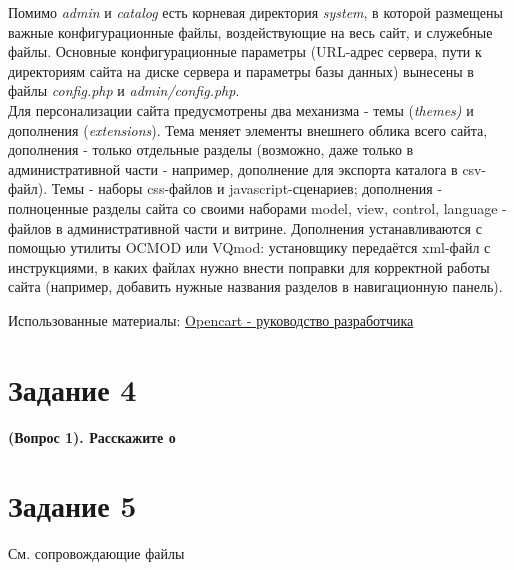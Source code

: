 \documentclass[a4paper,12pt]{article} %
\begin{document}
Помимо \textit{admin} и \textit{catalog} есть корневая директория \textit{system}, в которой размещены важные конфигурационные файлы, воздействующие на весь сайт, и служебные файлы. Основные конфигурационные параметры (URL-адрес сервера, пути к директориям сайта на диске сервера и параметры базы данных) вынесены в файлы \textit{config.php} и \textit{admin/config.php}.\\
Для персонализации сайта предусмотрены два механизма - темы (\textit{themes)} и дополнения (\textit{extensions}). Тема меняет элементы внешнего облика всего сайта, дополнения - только отдельные разделы (возможно, даже только в административной части - например, дополнение для экспорта каталога в csv-файл). Темы - наборы css-файлов и javascript-сценариев; дополнения - полноценные разделы сайта со своими наборами model, view, control, language - файлов в административной части и витрине. Дополнения устанавливаются с помощью утилиты OCMOD или VQmod: установщику передаётся xml-файл с инструкциями, в каких файлах нужно внести поправки для корректной работы  сайта (например, добавить нужные названия разделов в навигационную панель).

\begin{flushright}
	Использованные материалы: \href{https://docs.ocstore.com/index.php?title=%D0%A0%D1%83%D0%BA%D0%BE%D0%B2%D0%BE%D0%B4%D1%81%D1%82%D0%B2%D0%BE_%D0%A0%D0%B0%D0%B7%D1%80%D0%B0%D0%B1%D0%BE%D1%82%D1%87%D0%B8%D0%BA%D0%B0}{Opencart - руководство разработчика}
\end{flushright}
		

\section{Задание 4}
\textbf{(Вопрос 1). Расскажите о }

\section{Задание 5}
См. сопровождающие файлы


	
\end{document}
